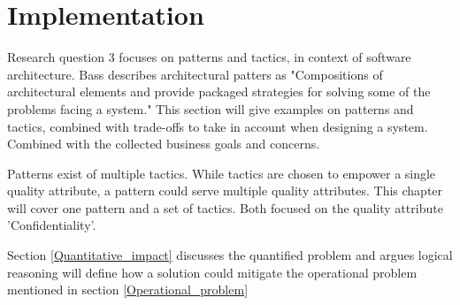 \chapter{Implementation}\label{s:Implementation}
Research question 3 focuses on patterns and tactics, in context of software architecture. Bass \etal \cite{Bass2015SoftwareAI} describes architectural patters as "Compositions of architectural elements and provide packaged strategies for solving some of the problems facing a system." This section will give examples on patterns and tactics, combined with trade-offs to take in account when designing a system. Combined with the collected business goals and concerns.

Patterns exist of multiple tactics. While tactics are chosen to empower a single quality attribute, a pattern could serve multiple quality attributes. This chapter will cover one pattern and a set of tactics. Both focused on the quality attribute 'Confidentiality'.

Section \ref{Quantitative_impact} discusses the quantified problem and argues logical reasoning will define how a solution could mitigate the operational problem mentioned in section \ref{Operational_problem}
